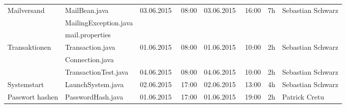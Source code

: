 \begin{landscape}
\begin{tabular}{|p{5.2cm} |p{7cm}|p{3.2cm}|p{3.2cm}|p{2cm}|p{3.5cm}|}
	\hline  Mailversand          & MailBean.java                              & 03.06.2015 \ \ 08:00       & 03.06.2015  \ \  16:00      &  7h                & Sebastian Schwarz\\ 	
	& MailingException.java                      &                            &                            &                                                  &\\
	& mail.properties                            &                            &                            &                                                  &\\
	\hline Transaktionen         & Transaction.java                           & 01.06.2015 \ \ 08:00       & 01.06.2015 \ \ 10:00        & 2h                 & Sebastian Schwarz\\  
	& Connection.java                            &                            &                            &                                                  &\\  
	& TransactionTest.java                       &  04.06.2015 \ \ 08:00      & 04.06.2015 \ \ 10:00       &   2h                       & Sebastian Schwarz \\                  
	\hline Systemstart           & LaunchSystem.java                          & 02.06.2015 \ \ 17:00       & 02.06.2015 \ \ 13:00        & 4h                 & Sebastian Schwarz\\
	\hline Passwort hashen       & PasswordHash.java                          & 01.06.2015 \ \ 17:00       & 01.06.2015 \ \ 19:00        & 2h                 & Patrick Cretu\\       	   
	\hline 
\end{tabular} \ \\
\ \\


\end{landscape}

